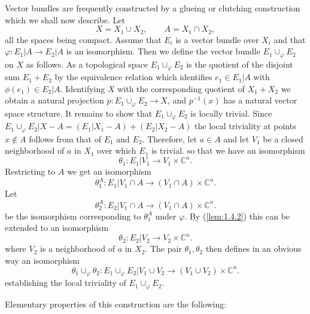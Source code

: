 Vector bundles are frequently constructed by a glueing or clutching construction which we shall now describe. Let
\begin{equation}
    X = X_1 \cup X_2, \qquad A = X_1 \cap X_2,
\end{equation}
all the spaces being compact. Assume that $E_i$ is a vector bundle over $X_i$ and that $\varphi: E_1 \vert A \to E_2 \vert A $ is an isomorphism. Then we define the vector bundle $E_1 \cup_\varphi E_2$ on $X$ as follows. As a topological space $E_1 \cup_\varphi E_2$ is the quotient of the disjoint sum $E_1 + E_2$ by the equivalence relation which identifies $e_1 \in E_1 \vert A$ with $\phi(e_1) \in E_2 \vert A$. Identifying $X$ with the corresponding quotient of $X_1 + X_2$ we obtain a natural projection $p: E_1 \cup_\varphi E_2 \to X$, and $p^{-1}(x)$ has a natural vector space structure. It remains to show that $E_1 \cup_\varphi E_2$ is locally trivial. Since $E_1 \cup_\varphi E_2 \vert X - A = (E_1 \vert X_1 - A) + (E_2 \vert X_2 - A)$ the local triviality at points $x \notin A$ follows from that of $E_1$ and $E_2$. Therefore, let $a \in A$ and let $V_1$ be a closed neighborhood of $a$ in $X_1$ over which $E_1$ is trivial. so that we have an isomorphism
\begin{equation}
    \theta_1: E_1 \vert V_1 \to V_1 \times \mathbb{C}^n.
\end{equation}
Restricting to $A$ we get an isomorphism
\begin{equation}
    \theta_1^A: E_1 \vert V_1 \cap A \to (V_1 \cap A) \times \mathbb{C}^n.
\end{equation}
Let
\begin{equation}
    \theta_2^A: E_2 \vert V_1 \cap A \to (V_1 \cap A) \times \mathbb{C}^n.
\end{equation}
be the isomorphism corresponding to $\theta_1^A$ under $\varphi$. By (\ref{lem:1.4.2}) this can be extended to an isomorphism
\begin{equation}
    \theta_2: E_2 \vert V_2 \to V_2 \times \mathbb{C}^n.
\end{equation}
where $V_2$ is a neighborhood of $a$ in $X_2$. The pair $\theta_1, \theta_2$ then defines in an obvious way an isomorphism
\begin{equation}
    \theta_1 \cup_\varphi \theta_2: E_1 \cup_\varphi E_2 \vert V_1 \cup V_2 \to (V_1 \cup V_2) \times \mathbb{C}^n.
\end{equation}
establishing the local triviality of $E_1 \cup_\varphi E_2$. \par 

Elementary properties of this construction are the following:

